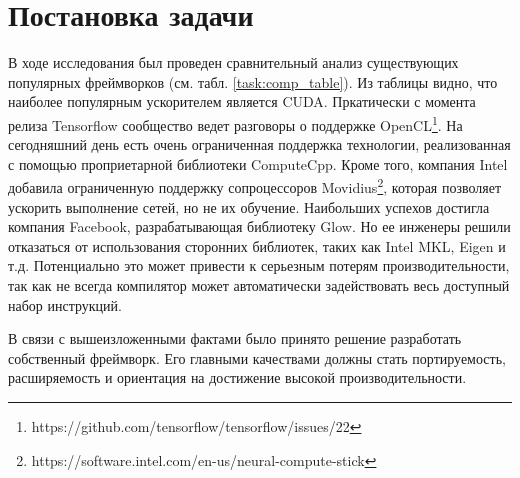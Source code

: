 \clearpage
\section{Постановка задачи}
В ходе исследования был проведен сравнительный анализ существующих популярных фреймворков (см. табл. \ref{task:comp_table}). Из таблицы видно, что наиболее популярным ускорителем является CUDA. Пркатически с момента релиза Tensorflow сообщество ведет разговоры о поддержке OpenCL\footnote{https://github.com/tensorflow/tensorflow/issues/22}. На сегодняшний день есть очень ограниченная поддержка технологии, реализованная с помощью проприетарной библиотеки ComputeCpp. Кроме того, компания Intel добавила ограниченную поддержку сопроцессоров Movidius\footnote{https://software.intel.com/en-us/neural-compute-stick}, которая позволяет ускорить выполнение сетей, но не их обучение. Наибольших успехов достигла компания Facebook, разрабатывающая библиотеку Glow. Но ее инженеры решили отказаться от использования сторонних библиотек, таких как Intel MKL, Eigen и т.д. Потенциально это может привести к серьезным потерям производительности, так как не всегда компилятор может автоматически задействовать весь доступный набор инструкций.
\par
В связи с вышеизложенными фактами было принято решение разработать собственный фреймворк. Его главными качествами должны стать портируемость, расширяемость и ориентация на достижение высокой производительности.
\par
